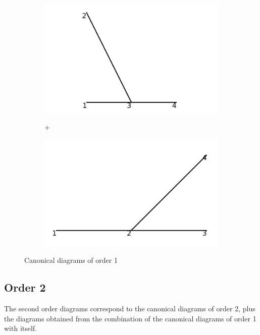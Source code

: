 \documentclass[11pt,a4paper,twoside,pdf]{article}
\numberwithin{equation}{section}
\begin{document}
\begin{figure}[h!]
    \centering
    \begin{subfigure}[t]{0.33\textwidth}
        \centering
        \includegraphics[width=\textwidth]{plots/canonical/order1/1.png}
        \caption{ }
        \label{fig:cannonical1_1}
    \end{subfigure}%
    \begin{subfigure}[t]{0.1\textwidth}
        \centering
        {\LARGE $+$}
    \end{subfigure}
    \begin{subfigure}[t]{0.33\textwidth}
        \centering
        \includegraphics[width=\textwidth]{plots/canonical/order1/2.png}
        \caption{ }
        \label{fig:cannonical1_2}
    \end{subfigure}
    \caption{Canonical diagrams of order 1}
    \label{fig:cannonical1}
\end{figure}

\subsection{Order 2}
The second order diagrams correspond to the canonical diagrams of order 2,
plus the diagrams obtained from the combination of the canonical diagrams of order 1 with 
itself.
\end{document}
